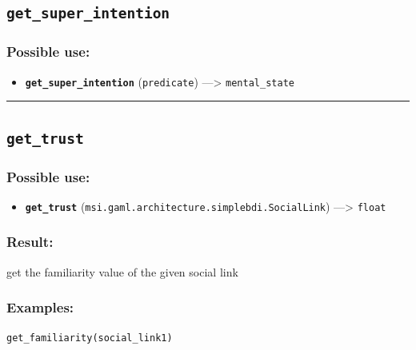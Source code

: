 \documentclass[]{book}
\providecommand{\tightlist}{%
  \setlength{\itemsep}{0pt}\setlength{\parskip}{0pt}}
\theoremstyle{definition}
\theoremstyle{definition}
\theoremstyle{definition}
\theoremstyle{remark}
\begin{document}
\subsection{\texorpdfstring{\texttt{get\_super\_intention}}{get\_super\_intention}}\label{get_super_intention}

\subsubsection{Possible use:}\label{possible-use-229}

\begin{itemize}
\tightlist
\item
  \textbf{\texttt{get\_super\_intention}} (\texttt{predicate})
  ---\textgreater{} \texttt{mental\_state}
\end{itemize}

\begin{center}\rule{0.5\linewidth}{\linethickness}\end{center}

\subsection{\texorpdfstring{\texttt{get\_trust}}{get\_trust}}\label{get_trust}

\subsubsection{Possible use:}\label{possible-use-230}

\begin{itemize}
\tightlist
\item
  \textbf{\texttt{get\_trust}}
  (\texttt{msi.gaml.architecture.simplebdi.SocialLink})
  ---\textgreater{} \texttt{float}
\end{itemize}

\subsubsection{Result:}\label{result-223}

get the familiarity value of the given social link

\subsubsection{Examples:}\label{examples-176}

\begin{verbatim}
get_familiarity(social_link1) 
\end{verbatim}
\end{document}
